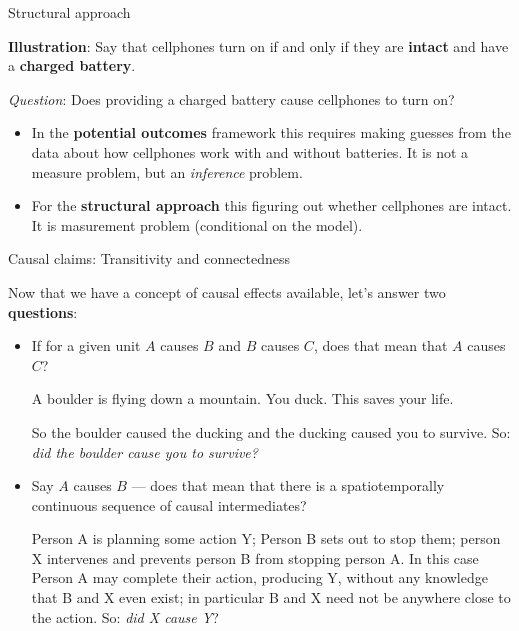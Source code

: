 \documentclass[11pt,ignorenonframetext,]{beamer}
\providecommand{\tightlist}{%
  \setlength{\itemsep}{0pt}\setlength{\parskip}{0pt}}
\begin{document}
\begin{frame}{Structural approach}

\textbf{Illustration}: Say that cellphones turn on if and only if they
are \textbf{intact} and have a \textbf{charged battery}.

\emph{Question}: Does providing a charged battery cause cellphones to
turn on?

\begin{itemize}
\tightlist
\item
  In the \textbf{potential outcomes} framework this requires making
  guesses from the data about how cellphones work with and without
  batteries. It is not a measure problem, but an \emph{inference}
  problem.
\item
  For the \textbf{structural approach} this figuring out whether
  cellphones are intact. It is masurement problem (conditional on the
  model).
\end{itemize}

\end{frame}

\begin{frame}{Causal claims: Transitivity and connectedness}

Now that we have a concept of causal effects available, let's answer two
\textbf{questions}:

\begin{itemize}
        \item If for a given unit $A$ causes $B$ and $B$ causes $C$, does that mean that $A$ causes $C$? 
        
        \color{white}\small A boulder is flying down a mountain. You duck. This saves your life.  
            
            So the boulder caused the ducking and the ducking caused you to survive. So: \textit{did the boulder cause you to survive?} 
        \color{black}
        \item Say $A$ causes $B$ --- does that mean that there is a spatiotemporally continuous sequence of causal intermediates? 
        
        \color{white}\small Person A is planning some action Y; Person B sets out to stop them; person X intervenes and prevents person B from stopping person A. In this case Person A may complete their action, producing Y, without any knowledge that B and X even exist; in particular B and X need not be anywhere close to the action. So: \textit{ did X cause Y}? 
\end{itemize}

\end{frame}
\end{document}
